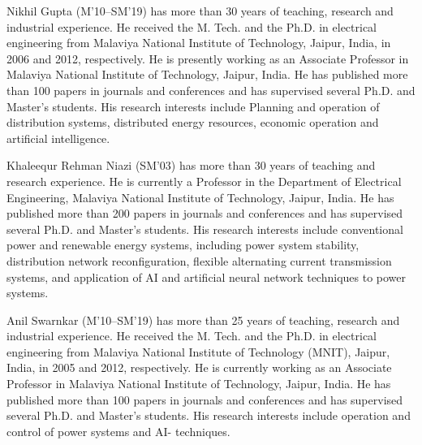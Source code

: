 \documentclass[journal]{IEEEtran}
\begin{document}
\begin{IEEEbiography}[{
		\texttt{[image: \{./GTIBDRPicx/Nikhil.jpg]}}}
	]{Nikhil Gupta} (M’10–SM’19) has more than 30 years of teaching, research and industrial experience. He received the M. Tech. and the Ph.D. in electrical engineering from Malaviya National Institute of Technology, Jaipur, India, in 2006 and 2012, respectively. He is presently working as an Associate Professor in Malaviya National Institute of Technology, Jaipur, India. He has published more than 100 papers in journals and conferences and has supervised several Ph.D. and Master’s students. His research interests include Planning and operation of distribution systems, distributed energy resources, economic operation and artificial intelligence. 
\end{IEEEbiography}

\begin{IEEEbiography}[{
		\texttt{[image: \{./GTIBDRPicx/KRN.jpg]}}}
	]{Khaleequr Rehman Niazi} (SM’03) has more than 30 years of teaching and research experience. He is currently a Professor in the Department of Electrical Engineering, Malaviya National Institute of Technology, Jaipur, India. He has published more than 200 papers in journals and conferences and has supervised several Ph.D. and Master’s students. His research interests include conventional power and renewable energy systems, including power system stability, distribution network reconfiguration, flexible alternating current transmission systems, and application of AI and artificial neural network techniques to power systems. 
\end{IEEEbiography}

\begin{IEEEbiography}[{
		\texttt{[image: \{./GTIBDRPicx/AS.jpg]}}}
	]{Anil Swarnkar} (M’10–SM’19) has more than 25 years of teaching, research and industrial experience. He received the M. Tech. and the Ph.D. in electrical engineering from Malaviya National Institute of Technology (MNIT), Jaipur, India, in 2005 and 2012, respectively. He is currently working as an Associate Professor in Malaviya National Institute of Technology, Jaipur, India. He has published more than 100 papers in journals and conferences and has supervised several Ph.D. and Master’s students. His research interests include operation and control of power systems and AI- techniques.  
\end{IEEEbiography}
\end{document}
